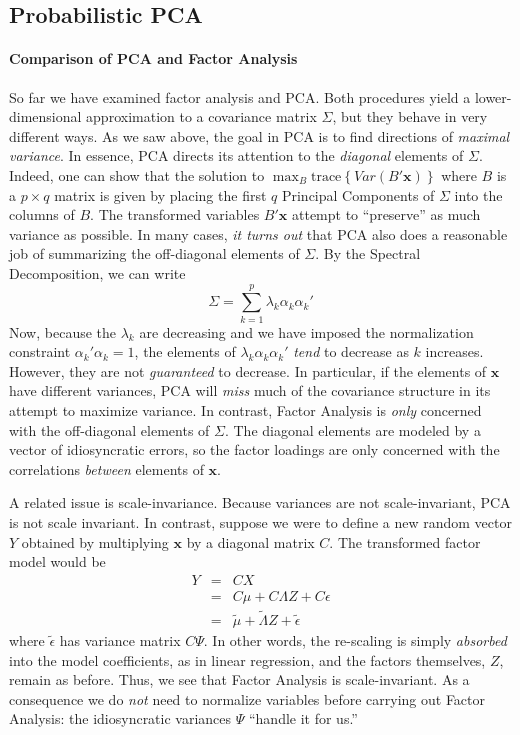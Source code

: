\documentclass[12pt]{article}
\theoremstyle{definition}
\begin{document}
\subsection{Probabilistic PCA}

\paragraph{Comparison of PCA and Factor Analysis}
So far we have examined factor analysis and PCA. Both procedures yield a lower-dimensional approximation to a covariance matrix $\Sigma$, but they behave in very different ways. As we saw above, the goal in PCA is to find directions of \emph{maximal variance}. In essence, PCA directs its attention to the \emph{diagonal} elements of $\Sigma$. Indeed, one can show that the solution to $\max_B \mbox{trace}\left\{Var(B'\mathbf{x}) \right\}$ where $B$ is a $p \times q$ matrix is given by placing the first $q$ Principal Components of $\Sigma$ into the columns of $B$. The transformed variables $B'\mathbf{x}$ attempt to ``preserve'' as much variance as possible. In many cases, \emph{it turns out} that PCA also does a reasonable job of summarizing the off-diagonal elements of $\Sigma$. By the Spectral Decomposition, we can write
	$$\Sigma = \sum_{k=1}^p \lambda_k \alpha_k \alpha_k'$$
Now, because the $\lambda_k$ are decreasing and we have imposed the normalization constraint $\alpha_k'\alpha_k =1$, the elements of $\lambda_k \alpha_k \alpha_k'$ \emph{tend} to decrease as $k$ increases. However, they are not \emph{guaranteed} to decrease. In particular, if the elements of $\mathbf{x}$ have different variances, PCA will \emph{miss} much of the covariance structure in its attempt to maximize variance. In contrast, Factor Analysis is \emph{only} concerned with the off-diagonal elements of $\Sigma$. The diagonal elements are modeled by a vector of idiosyncratic errors, so the factor loadings are only concerned with the correlations \emph{between} elements of $\mathbf{x}$.

A related issue is scale-invariance. Because variances are not scale-invariant, PCA is not scale invariant. In contrast, suppose we were to define a new random vector $Y$ obtained by multiplying $\mathbf{x}$ by a diagonal matrix $C$. The transformed factor model would be
	\begin{eqnarray*}
		Y &=& C X\\
			&=& C\mu + C\Lambda Z + C\epsilon\\
			&=& \widetilde{\mu} + \widetilde{\Lambda}Z + \widetilde{\epsilon}
	\end{eqnarray*}
where $\widetilde{\epsilon}$ has variance matrix $C\Psi$. In other words, the re-scaling is simply \emph{absorbed} into the model coefficients, as in linear regression, and the factors themselves, $Z$, remain as before. Thus, we see that Factor Analysis is scale-invariant. As a consequence we do \emph{not} need to normalize variables before carrying out Factor Analysis: the idiosyncratic variances $\Psi$ ``handle it for us.''
\end{document}
